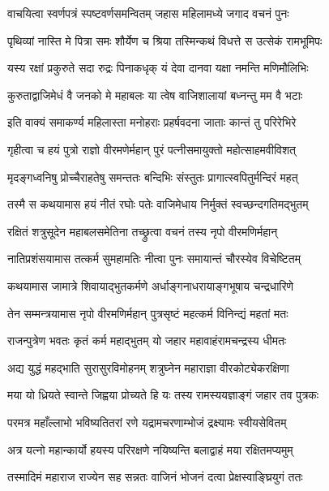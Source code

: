 \twolineshloka
{वाचयित्वा स्वर्णपत्रं स्पष्टवर्णसमन्वितम्}
{जहास महिलामध्ये जगाद वचनं पुनः}%


\twolineshloka
{पृथिव्यां नास्ति मे पित्रा समः शौर्येण च श्रिया}
{तस्मिन्कथं विधत्ते स उत्सेकं रामभूमिपः}%

\twolineshloka
{यस्य रक्षां प्रकुरुते सदा रुद्रः पिनाकधृक्}
{यं देवा दानवा यक्षा नमन्ति मणिमौलिभिः}%

\twolineshloka
{कुरुताद्वाजिमेधं वै जनको मे महाबलः}
{या त्वेष वाजिशालायां बध्नन्तु मम वै भटाः}%

\twolineshloka
{इति वाक्यं समाकर्ण्य महिलास्ता मनोहराः}
{प्रहर्षवदना जाताः कान्तं तु परिरेभिरे}%

\twolineshloka
{गृहीत्वा च हयं पुत्रो राज्ञो वीरमणेर्महान्}
{पुरं पत्नीसमायुक्तो महोत्साहमवीविशत्}%

\twolineshloka
{मृदङ्गध्वनिषु प्रोच्चैराहतेषु समन्ततः}
{बन्दिभिः संस्तुतः प्रागात्स्वपितुर्मन्दिरं महत्}%

\twolineshloka
{तस्मै स कथयामास हयं नीतं रघोः पतेः}
{वाजिमेधाय निर्मुक्तं स्वच्छन्दगतिमद्भुतम्}%

\twolineshloka
{रक्षितं शत्रुसूदेन महाबलसमेतिना}
{तच्छ्रुत्वा वचनं तस्य नृपो वीरमणिर्महान्}%

\twolineshloka
{नातिप्रशंसयामास तत्कर्म सुमहामतिः}
{नीत्वा पुनः समायान्तं चौरस्येव विचेष्टितम्}%

\twolineshloka
{कथयामास जामात्रे शिवायाद्भुतकर्मणे}
{अर्धाङ्गनाधरायाङ्गभूषाय चन्द्रधारिणे}%

\twolineshloka
{तेन सम्मन्त्रयामास नृपो वीरमणिर्महान्}
{पुत्रसृष्टं महत्कर्म विनिन्द्यं महतां मतः}%


\twolineshloka
{राजन्पुत्रेण भवतः कृतं कर्म महाद्भुतम्}
{यो जहार महावाहंरामचन्द्रस्य धीमतः}%

\twolineshloka
{अद्य युद्धं महद्भाति सुरासुरविमोहनम्}
{शत्रुघ्नेन महाराज्ञा वीरकोट्येकरक्षिणा}%

\twolineshloka
{मया यो ध्रियते स्वान्ते जिह्वया प्रोच्यते हि यः}
{तस्य रामस्ययज्ञाङ्गं जहार तव पुत्रकः}%

\twolineshloka
{परमत्र महाँल्लाभो भविष्यतितरां रणे}
{यद्रामचरणाम्भोजं द्रक्ष्यामः स्वीयसेवितम्}%

\twolineshloka
{अत्र यत्नो महान्कार्यो हयस्य परिरक्षणे}
{नयिष्यन्ति बलाद्वाहं मया रक्षितमप्यमुम्}%

\twolineshloka
{तस्मादिमं महाराज राज्येन सह सन्नतः}
{वाजिनं भोजनं दत्वा प्रेक्षस्वाङ्घ्रियुगं ततः}%

